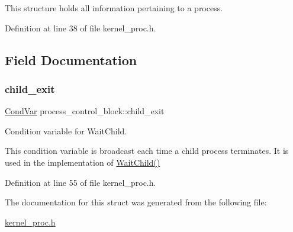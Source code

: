 This structure holds all information pertaining to a process. 

Definition at line 38 of file kernel\+\_\+proc.\+h.



\subsection{Field Documentation}
\mbox{\label{structprocess__control__block_a6bcb52e96fdf96d060af2b11f07d44bd}} 
\subsubsection{\texorpdfstring{child\+\_\+exit}{child\_exit}}
{\footnotesize\ttfamily \hyperlink{structCondVar}{Cond\+Var} process\+\_\+control\+\_\+block\+::child\+\_\+exit}



Condition variable for {\ttfamily Wait\+Child}. 

This condition variable is broadcast each time a child process terminates. It is used in the implementation of {\ttfamily \hyperlink{group__syscalls_ga37017afba05480740d26b033975fef03}{Wait\+Child()}} 

Definition at line 55 of file kernel\+\_\+proc.\+h.



The documentation for this struct was generated from the following file\+:\begin{DoxyCompactItemize}
\item 
\hyperlink{kernel__proc_8h}{kernel\+\_\+proc.\+h}\end{DoxyCompactItemize}

